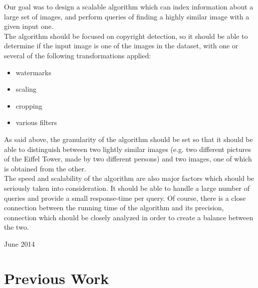 \documentclass[conference]{IEEEtran}
\begin{document}
Our goal was to design a scalable algorithm which can index information about a large set of images, and perform queries of finding a highly similar image with a given input one. \\
The algorithm should be focused on copyright detection, so it should be able to determine if the input image is one of the images in the dataset, with one or several of the following transformations applied:
\begin{itemize}
	\item watermarks
	\item scaling
	\item cropping
	\item various filters
\end{itemize}

As said above, the granularity of the algorithm should be set so that it should be able to distinguish between two lightly similar images (e.g. two different pictures of the Eiffel Tower, made by two different persons) and two images, one of which is obtained from the other.\\

The speed and scalability of the algorithm are also major factors which should be seriously taken into consideration. It should be able to handle a large number of queries and provide a small response-time per query. Of course, there is a close connection between the running time of the algorithm and its precision, connection which should be closely analyzed in order to create a balance between the two.

\hfill June 2014

\section{Previous Work}
\end{document}
